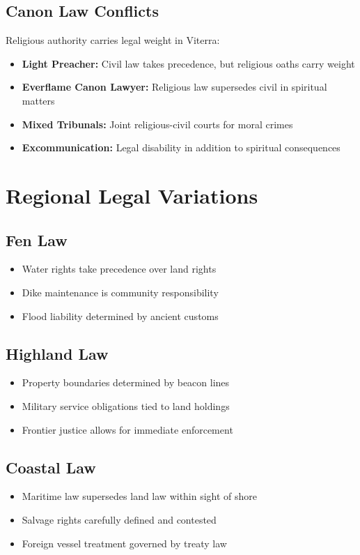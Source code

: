 \subsection*{Canon Law Conflicts}
Religious authority carries legal weight in Viterra:
\begin{itemize}
\item \textbf{Light Preacher:} Civil law takes precedence, but religious oaths carry weight
\item \textbf{Everflame Canon Lawyer:} Religious law supersedes civil in spiritual matters
\item \textbf{Mixed Tribunals:} Joint religious-civil courts for moral crimes
\item \textbf{Excommunication:} Legal disability in addition to spiritual consequences
\end{itemize}

\section*{Regional Legal Variations}

\subsection*{Fen Law}
\begin{itemize}
\item Water rights take precedence over land rights
\item Dike maintenance is community responsibility
\item Flood liability determined by ancient customs
\end{itemize}

\subsection*{Highland Law}
\begin{itemize}
\item Property boundaries determined by beacon lines
\item Military service obligations tied to land holdings
\item Frontier justice allows for immediate enforcement
\end{itemize}

\subsection*{Coastal Law}
\begin{itemize}
\item Maritime law supersedes land law within sight of shore
\item Salvage rights carefully defined and contested
\item Foreign vessel treatment governed by treaty law
\end{itemize}


